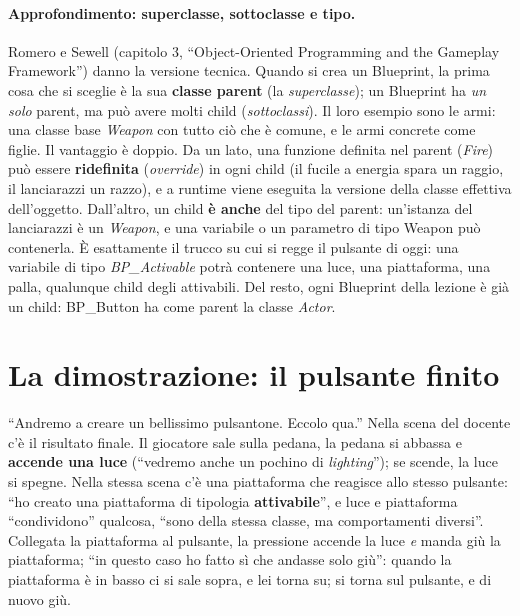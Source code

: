 \paragraph{Approfondimento: superclasse, sottoclasse e tipo.} Romero e Sewell (capitolo
3, ``Object-Oriented Programming and the Gameplay Framework'') danno la versione
tecnica. Quando si crea un Blueprint, la prima cosa che si sceglie è la sua
\textbf{classe parent} (la \emph{superclasse}); un Blueprint ha \emph{un solo} parent,
ma può avere molti child (\emph{sottoclassi}). Il loro esempio sono le armi: una classe
base \emph{Weapon} con tutto ciò che è comune, e le armi concrete come figlie. Il
vantaggio è doppio. Da un lato, una funzione definita nel parent (\emph{Fire}) può
essere \textbf{ridefinita} (\emph{override}) in ogni child (il fucile a energia spara un
raggio, il lanciarazzi un razzo), e a runtime viene eseguita la versione della classe
effettiva dell'oggetto. Dall'altro, un child \textbf{è anche} del tipo del parent:
un'istanza del lanciarazzi è un \emph{Weapon}, e una variabile o un parametro di tipo
Weapon può contenerla. È esattamente il trucco su cui si regge il pulsante di oggi: una
variabile di tipo \emph{BP\_Activable} potrà contenere una luce, una piattaforma, una
palla, qualunque child degli attivabili. Del resto, ogni Blueprint della lezione è già un
child: BP\_Button ha come parent la classe \emph{Actor}.

\section{La dimostrazione: il pulsante finito}
\label{ue7:sec:demo}

``Andremo a creare un bellissimo pulsantone. Eccolo qua.'' Nella scena del docente c'è
il risultato finale. Il giocatore sale sulla pedana, la pedana si abbassa e
\textbf{accende una luce} (``vedremo anche un pochino di \emph{lighting}''); se scende,
la luce si spegne. Nella stessa scena c'è una piattaforma che reagisce allo stesso
pulsante: ``ho creato una piattaforma di tipologia \textbf{attivabile}'', e luce e
piattaforma ``condividono'' qualcosa, ``sono della stessa classe, ma comportamenti
diversi''. Collegata la piattaforma al pulsante, la pressione accende la luce
\emph{e} manda giù la piattaforma; ``in questo caso ho fatto sì che andasse solo giù'':
quando la piattaforma è in basso ci si sale sopra, e lei torna su; si torna sul
pulsante, e di nuovo giù.

